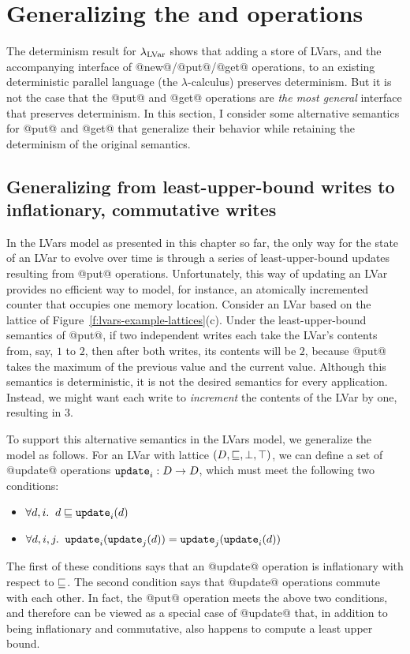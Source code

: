 \section{Generalizing the  and  operations}\label{s:lvars-generalizing}

The determinism result for $\lambda_{\textrm{LVar}}$ shows that adding a store of
LVars, and the accompanying interface of @new@/@put@/@get@ operations,
to an existing deterministic parallel language (the
$\lambda$-calculus) preserves determinism.  But it is not the case
that the @put@ and @get@ operations are \emph{the most general}
interface that preserves determinism.  In this section, I consider
some alternative semantics for @put@ and @get@ that generalize their
behavior while retaining the determinism of the original semantics.

\subsection{Generalizing from least-upper-bound writes to inflationary, commutative writes} 

In the LVars model as presented in this chapter so far, the only way
for the state of an LVar to evolve over time is through a series of
least-upper-bound updates resulting from @put@ operations.
Unfortunately, this way of updating an LVar provides no efficient way
to model, for instance, an atomically incremented counter that
occupies one memory location.  Consider an LVar based on the lattice
of Figure~\ref{f:lvars-example-lattices}(c).  Under the
least-upper-bound semantics of @put@, if two independent writes each
take the LVar's contents from, say, $1$ to $2$, then after both
writes, its contents will be $2$, because @put@ takes the maximum of
the previous value and the current value.  Although this semantics is
deterministic, it is not the desired semantics for every application.
Instead, we might want each write to \emph{increment} the contents of
the LVar by one, resulting in $3$.

To support this alternative semantics in the LVars model, we
generalize the model as follows.  For an LVar with lattice $(D,
\sqsubseteq, \bot, \top)$, we can define a set of @update@ operations
$\mbox{\texttt{update}}_i : D \rightarrow D$, which must meet the following two
conditions:
\begin{itemize}
\item $\forall d, i.     \;\; d \sqsubseteq \mbox{\texttt{update}}_i(d) $
\item $\forall d, i, j.  \;\; \mbox{\texttt{update}}_i(\mbox{\texttt{update}}_j(d)) = \mbox{\texttt{update}}_j(\mbox{\texttt{update}}_i(d)) $
\end{itemize}
The first of these conditions says that an @update@ operation is
inflationary with respect to $\sqsubseteq$.  The second condition says
that @update@ operations commute with each other.  In fact, the @put@
operation meets the above two conditions, and therefore can be viewed
as a special case of @update@ that, in addition to being inflationary
and commutative, also happens to compute a least upper bound.

